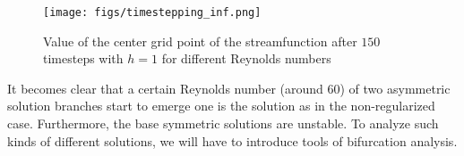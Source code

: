 \begin{figure}[ht!]
\begin{center}
  \texttt{[image: figs/timestepping\_inf.png]}
\end{center}
\caption{Value of the center grid point of the streamfunction after $150$
  timesteps with $h=1$ for different Reynolds numbers}
\label{fig:timestepping}
\end{figure}

It becomes clear that a certain Reynolds number (around $60$) of two asymmetric
solution branches start to emerge one is the solution as in the non-regularized
case. Furthermore, the base symmetric solutions are unstable. To analyze such
kinds of different solutions, we will have to introduce tools of bifurcation
analysis.
